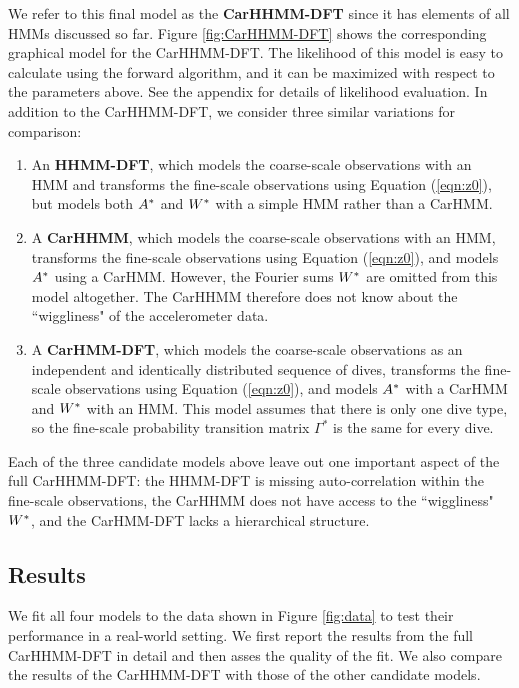 We refer to this final model as the \textbf{CarHHMM-DFT} since it has elements of all HMMs discussed so far. Figure \ref{fig:CarHHMM-DFT} shows the corresponding graphical model for the CarHHMM-DFT. The likelihood of this model is easy to calculate using the forward algorithm, and it can be maximized with respect to the parameters above. See the appendix for details of likelihood evaluation. In addition to the CarHHMM-DFT, we consider three similar variations for comparison:
\begin{enumerate}
    \item An \textbf{HHMM-DFT}, which models the coarse-scale observations with an HMM and transforms the fine-scale observations using Equation (\ref{eqn:z0}), but models both $A^*$ and $W^*$ with a simple HMM rather than a CarHMM.
    \item A \textbf{CarHHMM}, which models the coarse-scale observations with an HMM, transforms the fine-scale observations using Equation (\ref{eqn:z0}), and models $A^*$ using a CarHMM. However, the Fourier sums $W^*$ are omitted from this model altogether. The CarHHMM therefore does not know about the ``wiggliness" of the accelerometer data.
    \item A \textbf{CarHMM-DFT}, which models the coarse-scale observations as an independent and identically distributed sequence of dives, transforms the fine-scale observations using Equation (\ref{eqn:z0}), and models $A^*$ with a CarHMM and $W^*$ with an HMM. This model assumes that there is only one dive type, so the fine-scale probability transition matrix $\Gamma^*$ is the same for every dive. 
\end{enumerate}
%
Each of the three candidate models above leave out one important aspect of the full CarHHMM-DFT: the HHMM-DFT is missing auto-correlation within the fine-scale observations, the CarHHMM does not have access to the ``wiggliness" $W^*$, and the CarHMM-DFT lacks a hierarchical structure.

\subsection{Results}

We fit all four models to the data shown in Figure \ref{fig:data} to test their performance in a real-world setting. We first report the results from the full CarHHMM-DFT in detail and then asses the quality of the fit. We also compare the results of the CarHHMM-DFT with those of the other candidate models.

